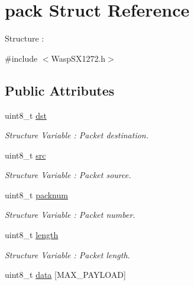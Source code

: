 \hypertarget{structpack}{}\section{pack Struct Reference}
\label{structpack}


Structure \+:  




{\ttfamily \#include $<$Wasp\+S\+X1272.\+h$>$}

\subsection*{Public Attributes}
\begin{DoxyCompactItemize}
\item 
uint8\+\_\+t \hyperlink{structpack_a3766953a3532a16001702a4fe8065394}{dst}\hypertarget{structpack_a3766953a3532a16001702a4fe8065394}{}\label{structpack_a3766953a3532a16001702a4fe8065394}

\begin{DoxyCompactList}\small\item\em Structure Variable \+: Packet destination. \end{DoxyCompactList}\item 
uint8\+\_\+t \hyperlink{structpack_a08411fca7038fcde60283b245cd650ae}{src}\hypertarget{structpack_a08411fca7038fcde60283b245cd650ae}{}\label{structpack_a08411fca7038fcde60283b245cd650ae}

\begin{DoxyCompactList}\small\item\em Structure Variable \+: Packet source. \end{DoxyCompactList}\item 
uint8\+\_\+t \hyperlink{structpack_a912fb3ac63a155abae46b08b2c471c93}{packnum}\hypertarget{structpack_a912fb3ac63a155abae46b08b2c471c93}{}\label{structpack_a912fb3ac63a155abae46b08b2c471c93}

\begin{DoxyCompactList}\small\item\em Structure Variable \+: Packet number. \end{DoxyCompactList}\item 
uint8\+\_\+t \hyperlink{structpack_a5f62b8525c8b817954479aae72aecb87}{length}\hypertarget{structpack_a5f62b8525c8b817954479aae72aecb87}{}\label{structpack_a5f62b8525c8b817954479aae72aecb87}

\begin{DoxyCompactList}\small\item\em Structure Variable \+: Packet length. \end{DoxyCompactList}\item 
uint8\+\_\+t \hyperlink{structpack_ad4c8b591118cf6566bd0e95370e37af8}{data} \mbox{[}M\+A\+X\+\_\+\+P\+A\+Y\+L\+O\+AD\mbox{]}\hypertarget{structpack_ad4c8b591118cf6566bd0e95370e37af8}{}\label{structpack_ad4c8b591118cf6566bd0e95370e37af8}


\end{DoxyCompactItemize}
